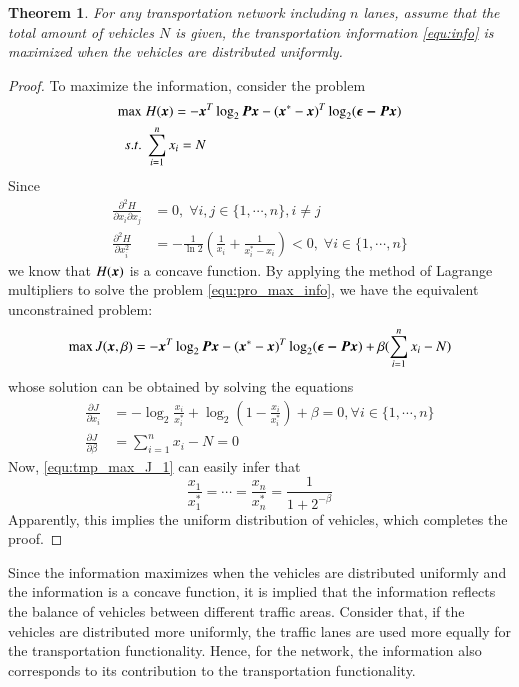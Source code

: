 \documentclass[preprint,authoryear,12pt]{elsarticle}
\renewcommand{\vec}[1]{\mbox{\boldmath$#1$}}
\newcommand{\mat}[1]{\mbox{\boldmath$#1$}}
\newtheorem{thm}{Theorem}
\begin{document}
\begin{thm}\label{thm:info_max}
For any transportation network including $n$ lanes, assume that the total amount of vehicles $N$ is given, the transportation information \eqref{equ:info} is maximized when the vehicles are distributed uniformly.
\end{thm}
\begin{proof}
To maximize the information, consider the problem
\begin{align}\label{equ:pro_max_info}
\max\; &H(\vec{x}) = -\vec{x}^T\log_2\mat{P}\vec{x}
-(\vec{x}^*-\vec{x})^T\log_2(\vec{\epsilon-\mat{P}\vec{x}})\\
s.t.\; &\sum_{i=1}^n x_i = N \nonumber
\end{align}
Since
\begin{align*}
\frac{\partial^2 H}{\partial x_i\partial x_j} &= 0,\;\forall
i,j\in\{1,\cdots,n\},i\neq j\\
\frac{\partial^2 H}{\partial x_i^2} &= -\frac{1}{\ln
2}(\frac{1}{x_i}+\frac{1}{x_i^*-x_i})<0,\;\forall i\in\{1,\cdots,n\}
\end{align*}
we know that $H(\vec{x})$ is a concave function. By applying the method of Lagrange multipliers to solve the problem \eqref{equ:pro_max_info}, we have the equivalent unconstrained problem:
$$\max J(\vec{x},\beta) =
-\vec{x}^T\log_2\mat{P}\vec{x}
-(\vec{x}^*-\vec{x})^T\log_2(\vec{\epsilon-\mat{P}\vec{x}})
+\beta(\sum_{i=1}^n x_i - N)$$
whose solution can be obtained by solving the equations
\begin{align}
\label{equ:tmp_max_J_1}
\frac{\partial J}{\partial x_i} &=
-\log_2\frac{x_i}{x_i^*}+\log_2(1-\frac{x_i}{x_i^*})+\beta =0,
\forall i\in\{1,\cdots,n\}\\
\label{equ:tmp_max_J_2}
\frac{\partial J}{\partial \beta} &= \sum_{i=1}^n x_i - N =0
\end{align}
Now, \eqref{equ:tmp_max_J_1} can easily infer that
$$\frac{x_1}{x_1^*}=\cdots=\frac{x_n}{x_n^*}=\frac{1}{1+2^{-\beta}}
$$
Apparently, this implies the uniform distribution of vehicles, which completes the proof.
\end{proof}

Since the information maximizes when the vehicles are distributed uniformly and the information is a concave function, it is implied that the information reflects the balance of vehicles between different traffic areas. Consider that, if the vehicles are distributed more uniformly, the traffic lanes are used more equally for the transportation functionality. Hence, for the network, the information also corresponds to its contribution to the transportation functionality.
\end{document}
